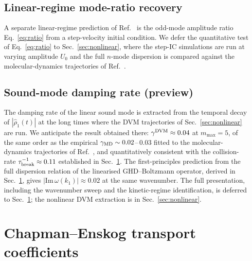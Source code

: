 \documentclass[aps,pre,twocolumn,superscriptaddress,longbibliography,floatfix]{revtex4-2}
\begin{document}
\subsection{Linear-regime mode-ratio recovery}

A separate linear-regime prediction of Ref.~\cite{PaperIV}
is the odd-mode amplitude ratio Eq.~\eqref{eq:ratio} from a
step-velocity initial condition. We defer the quantitative
test of Eq.~\eqref{eq:ratio} to Sec.~\ref{sec:nonlinear},
where the step-IC simulations are run at varying amplitude
$U_0$ and the full $n$-mode dispersion is compared against
the molecular-dynamics trajectories of Ref.~\cite{PaperIII}.

\subsection{Sound-mode damping rate (preview)}

The damping rate of the linear sound mode is extracted from
the temporal decay of $|\hat\rho_1(t)|$ at the long times
where the DVM trajectories of Sec.~\ref{sec:nonlinear} are
run. We anticipate the result obtained there:
$\gamma^{\rm DVM}\approx 0.04$ at $m_{\max}=5$, of the same
order as the empirical $\gamma_{\rm MD}\sim 0.02$--$\,0.03$
fitted to the molecular-dynamics trajectories of
Ref.~\cite{PaperII}, and quantitatively consistent with the
collision-rate $\tau_{\rm break}^{-1}\approx 0.11$
established in Sec.~\ref{sec:nu}. The first-principles
prediction from the full dispersion relation of the
linearised GHD--Boltzmann operator, derived in
Sec.~\ref{sec:nu}, gives $|\mathrm{Im}\,\omega(k_1)|\approx
0.02$ at the same wavenumber. The full presentation,
including the wavenumber sweep and the kinetic-regime
identification, is deferred to Sec.~\ref{sec:nu}; the
nonlinear DVM extraction is in Sec.~\ref{sec:nonlinear}.

\section{Chapman--Enskog transport coefficients}\label{sec:nu}
\end{document}
